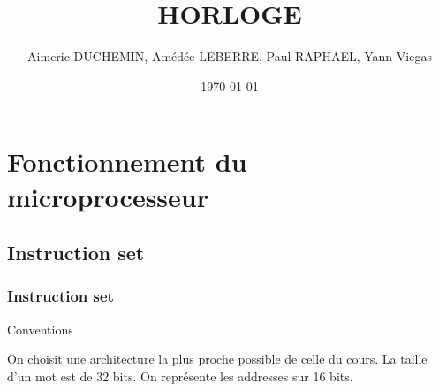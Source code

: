 \documentclass[12pt]{beamer}
\title{HORLOGE}
\author{Aimeric DUCHEMIN, Amédée LEBERRE, Paul RAPHAEL, Yann Viegas}
\institute{ENS Ulm}
\date{\today}
\begin{document}

\frame{\titlepage} %

\begin{frame}
\tableofcontents %
\end{frame}


\section{Fonctionnement du microprocesseur}
\subsection{Instruction set}

\begin{frame}
\frametitle{Instruction set}

\begin{prop}{Conventions}{}

    On choisit une architecture la plus proche possible de celle du cours. La taille d'un mot est de 32 bits.
    On représente les addresses sur 16 bits.\\
    
\end{prop}
\end{frame}
\end{document}

